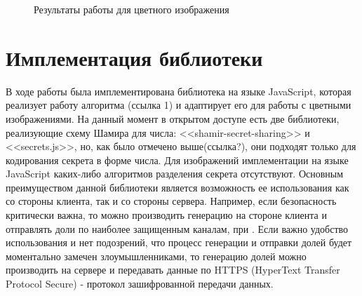 \documentclass[a4paper,article,14pt]{extarticle}
\begin{document}
\begin{figure}[ph!]
\begin{minipage}[h]{0.3\linewidth}
    \end{minipage}
    \hfill
    \begin{minipage}[h]{0.3\linewidth}
    \end{minipage}
    \caption{Результаты работы для цветного изображения}
    \label{fig:experimental_mod}
\end{figure}

\newpage
\section{Имплементация библиотеки}

В ходе работы была имплементирована библиотека на языке JavaScript, которая реализует работу алгоритма (ссылка 1) и адаптирует его для
работы с цветными изображениями. 
На данный момент в открытом доступе есть две библиотеки, реализующие схему Шамира для числа: <<shamir-secret-sharing>> и <<secrets.js>>,
но, как было отмечено выше(ссылка?), они подходят только для кодирования секрета в форме числа. Для изображений
имплементации на языке JavaScript каких-либо алгоритмов разделения секрета отсутствуют.
Основным преимуществом данной библиотеки является возможность ее использования как со стороны клиента, так и со стороны сервера.
Например, если безопасность критически важна, то можно производить генерацию на стороне клиента и отправлять доли по наиболее защищенным
каналам, при . Если важно удобство использования и нет подозрений, что процесс генерации и отправки долей будет моментально замечен злоумышленниками,
то генерацию долей можно производить на сервере и передавать данные по HTTPS (HyperText Transfer Protocol Secure) - протокол зашифрованной
передачи данных.
\end{document}
